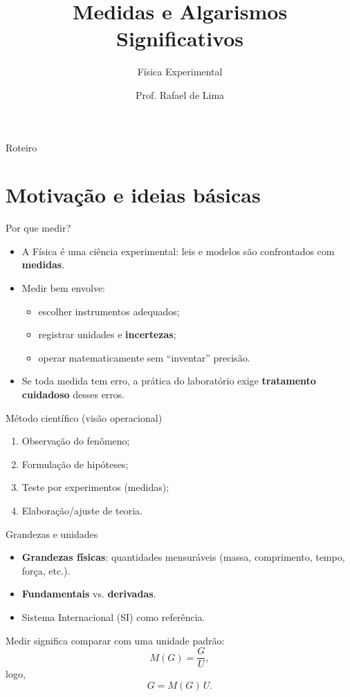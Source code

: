 \documentclass[aspectratio=169,10pt]{beamer}
\title{Medidas e Algarismos Significativos}
\subtitle{Física Experimental}
\author{Prof. Rafael de Lima}
\institute{Departamento de Física --- CCT/UDESC}
\date{}
\begin{document}
\begin{frame}
  \titlepage
\end{frame}

\begin{frame}{Roteiro}
\tableofcontents
\end{frame}

\section{Motivação e ideias básicas}

\begin{frame}{Por que medir?}
\begin{itemize}
  \item A Física é uma ciência experimental: leis e modelos são confrontados com \textbf{medidas}.
  \item Medir bem envolve:
  \begin{itemize}
    \item escolher instrumentos adequados;
    \item registrar unidades e \textbf{incertezas};
    \item operar matematicamente sem “inventar” precisão.
  \end{itemize}
  \item Se toda medida tem erro, a prática do laboratório exige \textbf{tratamento cuidadoso} desses erros.
\end{itemize}
\end{frame}

\begin{frame}{Método científico (visão operacional)}
\begin{enumerate}
  \item Observação do fenômeno;
  \item Formulação de hipóteses;
  \item Teste por experimentos (medidas);
  \item Elaboração/ajuste de teoria.
\end{enumerate}
\end{frame}

\begin{frame}{Grandezas e unidades}
\begin{itemize}
  \item \textbf{Grandezas físicas}: quantidades mensuráveis (massa, comprimento, tempo, força, etc.).
  \item \textbf{Fundamentais} vs. \textbf{derivadas}.
  \item Sistema Internacional (SI) como referência.
\end{itemize}

\vspace{0.3cm}
Medir significa comparar com uma unidade padrão:
\begin{equation}
\label{eq:def_MG}
M(G)=\frac{G}{U},
\end{equation}
logo,
\begin{equation}
\label{eq:G_MU}
G = M(G)\,U.
\end{equation}
\end{frame}
\end{document}
